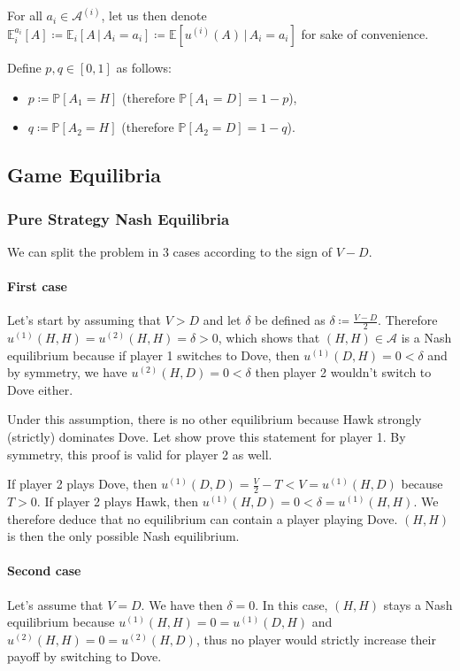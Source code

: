 \documentclass{article}
\renewcommand{\P}{\mathbb P}
\newcommand{\E}{\mathbb E}
\begin{document}
For all $a_i \in \mathcal A^{(i)}$, let us then denote
$\E_i^{a_i}[A] \coloneqq \E_i[A \, | \, A_i = a_i] \coloneqq \E[u^{(i)}(A) \, | \, A_i = a_i]$ for sake
of convenience.

Define $p, q \in [0, 1]$ as follows:
\begin{itemize}
	\item $p \coloneqq \P[A_1 = H]$ (therefore $\P[A_1 = D] = 1-p$),
	\item $q \coloneqq \P[A_2 = H]$ (therefore $\P[A_2 = D] = 1-q$).
\end{itemize}

\subsection{Game Equilibria}
\subsubsection{Pure Strategy Nash Equilibria}
We can split the problem in 3 cases according to the sign of $V-D$.

\paragraph{First case} Let's start by assuming that $V > D$ and let $\delta$ be defined as $\delta \coloneqq \frac {V-D}2$.
Therefore $u^{(1)}(H, H) = u^{(2)}(H, H) = \delta > 0$, which shows that $(H, H) \in \mathcal A$ is a Nash
equilibrium because if player 1 switches to Dove, then $u^{(1)}(D, H) = 0 < \delta$ and by symmetry, we have
$u^{(2)}(H, D) = 0 < \delta$ then player 2 wouldn't switch to Dove either.

Under this assumption, there is no other equilibrium because Hawk strongly (strictly) dominates Dove. Let
show prove this statement for player 1. By symmetry, this proof is valid for player 2 as well.

If player 2 plays Dove, then $u^{(1)}(D, D) = \frac V2 - T < V = u^{(1)}(H, D)$ because $T > 0$. If player 2 plays
Hawk, then $u^{(1)}(H, D) = 0 < \delta = u^{(1)}(H, H)$. We therefore deduce that no equilibrium can contain a player
playing Dove. $(H, H)$ is then the only possible Nash equilibrium.

\paragraph{Second case} Let's assume that $V = D$. We have then $\delta = 0$. In this case, $(H, H)$ stays
a Nash equilibrium because $u^{(1)}(H, H) = 0 = u^{(1)}(D, H)$ and $u^{(2)}(H, H) = 0 = u^{(2)}(H, D)$, thus no player
would strictly increase their payoff by switching to Dove.
\end{document}
